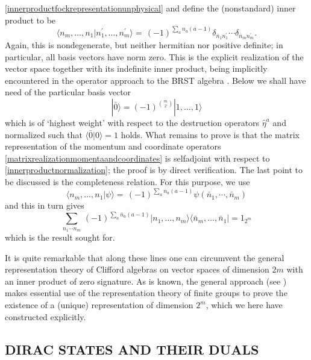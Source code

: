 \documentclass[a4paper,10pt]{article}
\begin{document}
\eqref{innerproductfockrepresentationunphysical} and define the (nonstandard) inner 
product to be
\begin{equation}\label{innerproductnormalization}
\langle n_m,\ldots,n_1|n^{\prime}_1,\ldots,n^{\prime}_m\rangle=\,(-1)^{\sum_{a}n_a(a-1)}
\delta_{\bar{n}_1n^{\prime}_1}\cdots\delta_{\bar{n}_mn^{\prime}_m}.
\end{equation}
Again, this is nondegenerate, but neither hermitian nor positive definite; in particular, 
all basis vectors have norm zero. This is the explicit realization of the vector space 
together with its indefinite inner product, being implicitly encountered in the operator 
approach to the BRST algebra \cite{Kugo 79,Nish 84}. Below we shall have need of the 
particular basis vector 
\begin{equation}\label{barzerorangle}
|\bar{0}\rangle=(-1)^{{m \choose 2}}|1,\ldots,1\rangle\end{equation}
which is of `highest weight' with respect to the destruction operators $\hat{\eta}^a$ and 
normalized such that $\langle\bar{0}|0\rangle=1$ holds. What remains to prove is that the 
matrix representation of the momentum and coordinate operators 
\eqref{matrixrealizationmomentaandcoordinates} is selfadjoint with respect to 
\eqref{innerproductnormalization}; the proof is by direct verification. The last point to 
be discussed is the completeness relation. For this purpose, we use
\begin{equation}
\langle n_m,\ldots,n_1|\psi\rangle=\,(-1)^{\sum_{a}n_a(a-1)}
\psi(\bar{n}_1,\cdots,\bar{n}_m)
\end{equation}
and this in turn gives
\begin{equation}\label{completenessrelationfockbasisrealfermins}
\sum\limits_{n_1\cdots n_m}\,(-1)^{\sum_{a}\bar{n}_a(a-1)}|n_1,\ldots,n_m\rangle
\langle \bar{n}_m,\ldots,\bar{n}_1|=1_{2^m}
\end{equation}
which is the result sought for.

It is quite remarkable that along these lines one can circumvent the general 
representation theory of Clifford algebras on vector spaces of dimension $2m$ with an 
inner product of zero signature. As is known, the general approach (see \cite{Roe 88}) makes essential 
use of the representation theory of finite groups to prove the existence of a (unique) 
representation of dimension $2^m$, which we here have constructed explicitly.

\subsection{DIRAC STATES AND THEIR DUALS}
\end{document}
